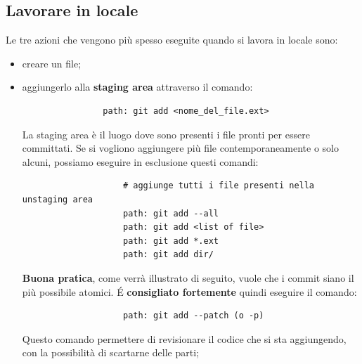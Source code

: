 	\subsection{Lavorare in locale} %
	\label{sub:lavorare_in_locale}
	Le tre azioni che vengono più spesso eseguite quando si lavora in locale sono:
		\begin{itemize}
			\item creare un file;
			\item aggiungerlo alla \textbf{staging area} attraverso il comando:
				\begin{verbatim}
				path: git add <nome_del_file.ext>
				\end{verbatim}
				\noindent
				La staging area è il luogo dove sono presenti i file pronti per essere committati.
				Se si vogliono aggiungere più file contemporaneamente o solo alcuni, possiamo eseguire in esclusione questi comandi:
					\begin{verbatim}
					# aggiunge tutti i file presenti nella unstaging area
					path: git add --all
					path: git add <list of file>
					path: git add *.ext
					path: git add dir/
					\end{verbatim}
				\noindent
				\textbf{Buona pratica}, come verrà illustrato di seguito, vuole che i commit siano il più possibile atomici. \'E \textbf{consigliato fortemente} quindi eseguire il comando:
					\begin{verbatim}
					path: git add --patch (o -p)
					\end{verbatim}
				\noindent
				Questo comando permettere di revisionare il codice che si sta aggiungendo, con la possibilità di scartarne delle parti;


\end{itemize}

